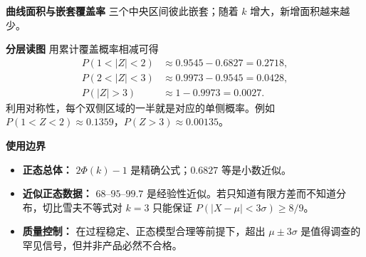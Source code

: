 \clearpage
\begin{explanationbox}
	\textbf{\textcolor{CExplanation}{曲线面积与嵌套覆盖率}}
	三个中央区间彼此嵌套；随着 $k$ 增大，新增面积越来越少。

	

	\textbf{\textcolor{CExplanation}{分层读图}}
	用累计覆盖概率相减可得
	\[
		\begin{aligned}
			P(1<|Z|<2)&\approx0.9545-0.6827=0.2718,\\
			P(2<|Z|<3)&\approx0.9973-0.9545=0.0428,\\
			P(|Z|>3)&\approx1-0.9973=0.0027.
		\end{aligned}
	\]
	利用对称性，每个双侧区域的一半就是对应的单侧概率。例如 $P(1<Z<2)\approx0.1359$，$P(Z>3)\approx0.00135$。

	\medskip
	\textbf{\textcolor{CExplanation}{使用边界}}
	\begin{itemize}[leftmargin=*, itemsep=0.35em, topsep=0.3em]
		\item \textbf{正态总体：} $2\Phi(k)-1$ 是精确公式；$0.6827$ 等是小数近似。
		\item \textbf{近似正态数据：} $68$--$95$--$99.7$ 是经验性近似。若只知道有限方差而不知道分布，切比雪夫不等式对 $k=3$ 只能保证 $P(|X-\mu|<3\sigma)\ge8/9$。
		\item \textbf{质量控制：} 在过程稳定、正态模型合理等前提下，超出 $\mu\pm3\sigma$ 是值得调查的罕见信号，但并非产品必然不合格。
	\end{itemize}
\end{explanationbox}
